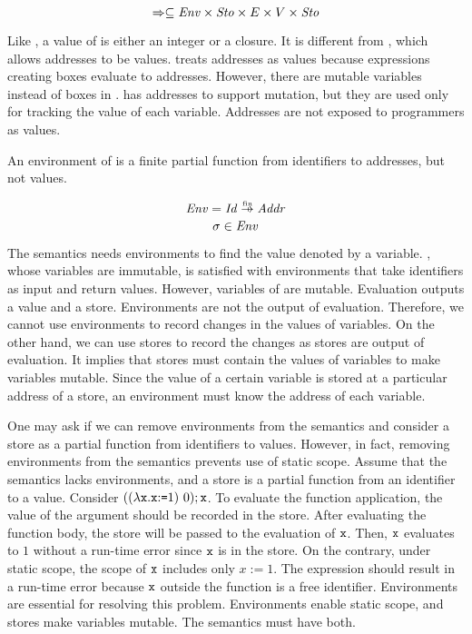 \[\Rightarrow\subseteq\mbox{\emph{Env}}\times\mbox{\emph{Sto}}\times E\times V\times\mbox{\emph{Sto}}\]

Like \plang, a value of \lang is either an integer or a closure. It is different
from \bfae, which allows addresses to be values. \bfae treats addresses as
values because expressions creating boxes evaluate to addresses. However, there
are mutable variables instead of boxes in \lang. \lang has addresses to support
mutation, but they are used only for tracking the value of each variable. Addresses
are not exposed to programmers as values.

An environment of \lang is a finite partial function from identifiers to addresses,
but not values.

\[ \embox{Env}=\embox{Id}\finto\embox{Addr} \]
\[ \sigma \in \mbox{\emph{Env}} \]

The semantics needs environments to find the value denoted by
a variable. \plang, whose variables are immutable, is
satisfied with environments that take identifiers as input and return values.
However, variables of \lang are mutable. Evaluation outputs a value and a store.
Environments are not the output of evaluation. Therefore, we cannot use
environments to record changes in the values of variables. On the other hand, we
can use stores to record the changes as stores are output of evaluation.
It implies that stores must contain the values of variables to make variables
mutable. Since the value of a certain variable is stored at a particular address
of a store, an environment must know the address of each variable.

One may ask if we can remove environments from the semantics and consider a
store as a partial function from identifiers to values. However, in fact,
removing environments from the semantics prevents use of static scope.
Assume that the semantics lacks environments, and a store is a partial
function from an identifier to a value.
Consider $((\lambda\texttt{x}.\texttt{x}{:}\texttt{=}1)\ 0);\texttt{x}$.
To evaluate the function application, the value of the argument should be
recorded in the store. After evaluating the function body, the store will
be passed to the evaluation of $\texttt{x}$. Then, $\texttt{x}$ evaluates to $1$
without a run-time error since $\texttt{x}$ is in the store.
On the contrary, under static scope, the scope of $\texttt{x}$ includes only $x:=1$.
The expression should result in a run-time error because $\texttt{x}$ outside the
function is a free identifier. Environments are essential for resolving this
problem. Environments enable static scope, and stores make variables mutable.
The semantics must have both.


